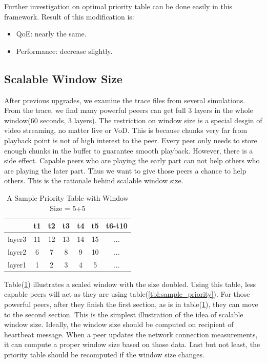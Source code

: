 \documentclass[11pt,a4paper]{article}
\begin{document}
Further investigation on optimal priority table can be done 
easily in this framework. Result of this modification is:
\begin{itemize}
	\item QoE: nearly the same. 
	\item Performance: decrease slightly. 
\end{itemize}


\subsection{Scalable Window Size}

After previous upgrades, we examine the trace files from 
several simulations. From the trace, we find many powerful peeers can get full 
3 layers in the whole window(60 seconds, 3 layers). 
The restriction on window size is a special desgin of video streaming, 
no matter live or VoD. This is because chunks very far from 
playback point is not of high interest to the peer. Every peer 
only needs to store enough chunks in the buffer to guarantee 
smooth playback. However, there is a side effect. Capable peers
who are playing the early part can not help others who are 
playing the later part. Thus we want to give those peers a chance to 
help others. This is the rationale behind scalable window size. 

\begin{table}[htb]
\centering
\caption{A Sample Priority Table with Window Size = 5+5}
\label{tbl:priority_scalable}
	\begin{tabular}{|c|ccccc|c|}
	\hline
	 & t1 & t2 & t3 & t4 & t5 & t6-t10 \\
	 \hline
	layer3 & 11 & 12 & 13 & 14 & 15 & ...\\
	layer2 & 6 & 7 & 8 & 9 & 10 & ... \\
	layer1 & 1 & 2 & 3 & 4 & 5  & ...\\
	\hline
	\end{tabular}
\end{table}

Table(\ref{tbl:priority_scalable}) illustrates a scaled 
window with the size doubled. Using this table, less capable 
peers will act as they are using table(\ref{tbl:sample_priority}). 
For those powerful peers, after they finish the first section, as 
is in table(\ref{tbl:priority_scalable}), they can move to the second
section. This is the simplest illustration of the idea of scalable 
window size. Ideally, the window size should be computed 
on recipient of heartbeat message. When a peer updates the 
network connection measurements, it can compute a proper window 
size based on those data. Last but not least, the priority table 
should be recomputed if the window size changes. 
\end{document}
